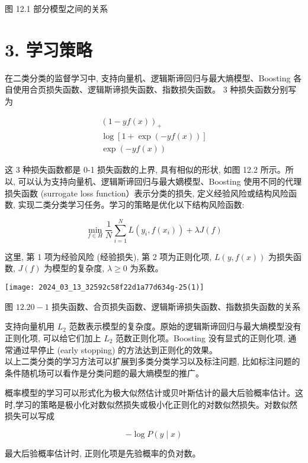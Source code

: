 \documentclass[10pt]{article}
\begin{document}
\begin{CJK*}{UTF8}{bsmi}
图 12.1 部分模型之间的关系

\section*{3. 学习策略}
在二类分类的监督学习中, 支持向量机、逻辑斯谛回归与最大熵模型、Boosting 各自使用合页损失函数、逻辑斯谛损失函数、指数损失函数。 3 种损失函数分别写为


\begin{gather*}
(1-y f(x))_{+}  \tag{12.1}\\
\log [1+\exp (-y f(x))]  \tag{12.2}\\
\exp (-y f(x)) \tag{12.3}
\end{gather*}


这 3 种损失函数都是 0-1 损失函数的上界, 具有相似的形状, 如图 12.2 所示。所以, 可以认为支持向量机、逻辑斯谛回归与最大嫡模型、Boosting 使用不同的代理损失函数 (surrogate loss function）表示分类的损失, 定义经验风险或结构风险函数, 实现二类分类学习任务。学习的策略是优化以下结构风险函数:


\begin{equation*}
\min _{f \in H} \frac{1}{N} \sum_{i=1}^{N} L\left(y_{i}, f\left(x_{i}\right)\right)+\lambda J(f) \tag{12.4}
\end{equation*}


这里, 第 1 项为经验风险 (经验损失), 第 2 项为正则化项, $L(y, f(x))$ 为损失函数, $J(f)$ 为模型的复杂度, $\lambda \geqslant 0$ 为系数。

\begin{center}
\texttt{[image: 2024\_03\_13\_32592c58f22d1a77d634g-25(1)]}
\end{center}

图 $12.20-1$ 损失函数、合页损失函数、逻辑斯谛损失函数、指数损失函数的关系

支持向量机用 $L_{2}$ 范数表示模型的复杂度。原始的逻辑斯谛回归与最大熵模型没有正则化项, 可以给它们加上 $L_{2}$ 范数正则化项。Boosting 没有显式的正则化项, 通常通过早停止 (early stopping) 的方法达到正则化的效果。\\
以上二类分类的学习方法可以扩展到多类分类学习以及标注问题, 比如标注问题的条件随机场可以看作是分类问题的最大熵模型的推广。

概率模型的学习可以形式化为极大似然估计或贝叶斯估计的最大后验概率估计。这时,学习的策略是极小化对数似然损失或极小化正则化的对数似然损失。对数似然损失可以写成

$$
-\log P(y \mid x)
$$

最大后验概率估计时, 正则化项是先验概率的负对数。


\end{CJK*}
\end{document}
